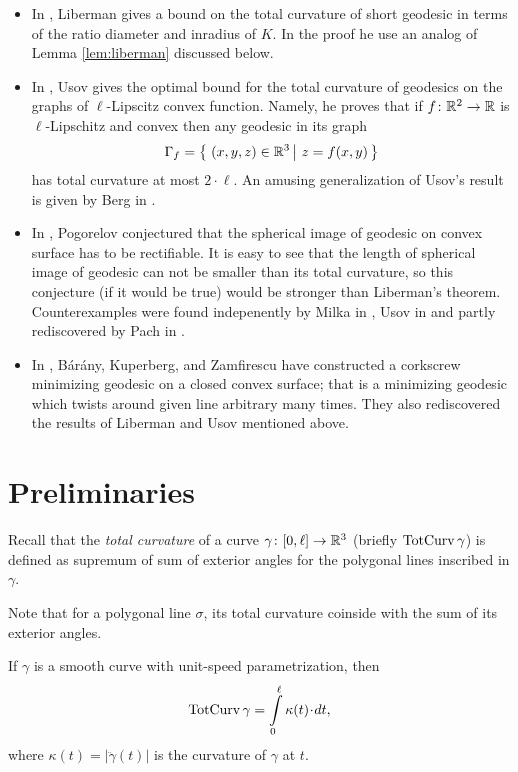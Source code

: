 \documentclass[a4paper,10pt]{amsart}
\begin{document}
\begin{itemize}
\item In \cite{liberman}, Liberman gives a bound on the total curvature of short geodesic in terms of the ratio diameter and inradius of $K$.
In the proof he use an analog of Lemma \ref{lem:liberman} discussed below.

\item In \cite{usov}, 
Usov gives the optimal bound for the total curvature of geodesics on the graphs of $\ell$-Lipscitz convex function. 
Namely, he proves that if $f\colon\mathbb{R}^2\to\mathbb{R}$ is $\ell$-Lipschitz and convex then any 
geodesic in its graph 
\[\Gamma_f=\set{(x,y,z)\in \RR^3}{z=f(x,y)}\] 
has total curvature at most $2\cdot \ell$.
An amusing generalization of Usov's result is given by Berg in \cite{berg}.
\item In \cite{pogorelov}, Pogorelov conjectured %
that the spherical image of geodesic on convex surface has to be rectifiable.
It is easy to see that the length of spherical image of geodesic can not be smaller than its total curvature, 
so this conjecture (if it would be true) 
would be stronger than Liberman's theorem.
Counterexamples were found indepenently by Milka in \cite{milka}, 
Usov in \cite{usov-conj-pog} 
and partly rediscovered by Pach in \cite{pach}.
\item In \cite{BKZ},
B{\'a}r{\'a}ny,
Kuperberg, 
and Zamfirescu 
have constructed a corkscrew minimizing geodesic on a closed convex surface;
that is a minimizing geodesic which twists around given line arbitrary many times.
They also rediscovered the results of Liberman and Usov mentioned above.
\end{itemize}


\section{Preliminaries}

Recall that the \emph{total curvature} of a curve $\gamma\colon[0,\ell]\to \mathbb{R}^3$ 
(briefly $\mathop{\rm TotCurv}\nolimits\gamma$)
is defined as supremum of sum of exterior angles 
for the polygonal lines inscribed in $\gamma$.

Note that for a polygonal line $\sigma$, 
its total curvature coinside with the sum of its exterior angles.

If $\gamma$ is a smooth curve with unit-speed parametrization, 
then 
\[\tc\gamma=\int\limits_0^\ell \kappa(t)\cdot dt,\]
where $\kappa(t)=|\ddot\gamma(t)|$ is the curvature of $\gamma$ at $t$.
\end{document}
